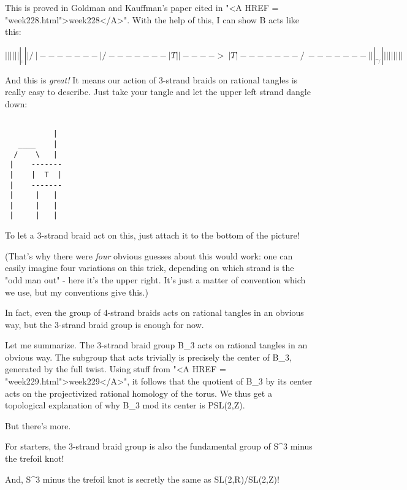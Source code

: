 This is proved in Goldman and Kauffman's paper cited in "<A HREF = "week228.html">week228</A>".
With the help of this, I can show B acts like this:


$$

  |   |              |          |
  |   |              |   ___    |
  |   |              |  /   \   |
 -------             | /    -------   
 |  T  |   |---->     \     |  T  |  
 -------             / \    ------- 
  |   |             |   \___/   | 
  |   |             |           | 
  |   |             |           |
$$
    
And this is \emph{great!}  It means our action of 3-strand braids on 
rational tangles is really easy to describe.  Just take your tangle
and let the upper left strand dangle down:


\begin{verbatim}

           |
   ____    |               
  /    \   |              
 |    -------           
 |    |  T  |   
 |    -------  
 |     |   |  
 |     |   | 
 |     |   |
\end{verbatim}
    
To let a 3-strand braid act on this, just attach it to the bottom of
the picture!   

(That's why there were \emph{four} obvious guesses about this would work:
one can easily imagine four variations on this trick, depending on 
which strand is the "odd man out" - here it's the upper right.  It's
just a matter of convention which we use, but my conventions give this.)

In fact, even the group of 4-strand braids acts on rational tangles in 
an obvious way, but the 3-strand braid group is enough for now.

Let me summarize.  
The 3-strand braid group B_{3} acts on rational tangles
in an obvious way.  The subgroup that acts trivially is precisely the 
center of B_{3}, generated by the full twist.  
Using stuff from "<A HREF = "week229.html">week229</A>", 
it follows that the quotient of B_{3} by its center acts 
on the projectivized 
rational homology of the torus.  We thus get a topological explanation 
of why B_{3} mod its center is PSL(2,Z).

But there's more.

For starters, the 3-strand braid group is also the fundamental group of 
S^{3} minus the trefoil knot!

And, S^{3} minus the trefoil knot is secretly the same as
SL(2,R)/SL(2,Z)!

